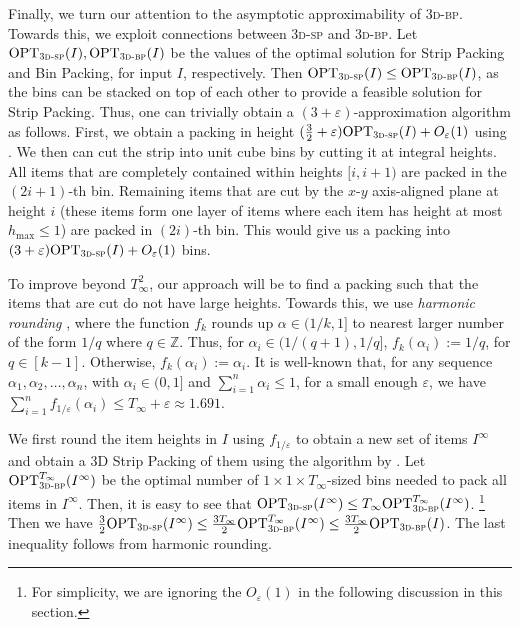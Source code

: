 \documentclass[a4paper,UKenglish,cleveref, autoref, thm-restate]{lipics-v2021}
\newcommand{\eps}{\varepsilon}
\newcommand{\opt}{\mathrm{OPT}}
\newcommand{\tbp}{\textsc{3d-bp}\xspace}
\newcommand{\tsp}{\textsc{3d-sp}\xspace}
\begin{document}
Finally, we turn our attention to the asymptotic approximability of \tbp.
Towards this, we exploit connections between \tsp and \tbp. 
Let $\opt_{\tsp}(I), \opt_{\tbp}(I)$ be the values of the optimal solution for Strip Packing and Bin Packing, for input $I$, respectively. Then $\opt_{\tsp}(I) \le \opt_{\tbp}(I)$, as the bins can be stacked on top of each other to provide a feasible solution for Strip Packing.
Thus, one can trivially obtain a $(3+\eps)$-approximation algorithm as follows. First, we obtain a packing in height $(\frac32+\eps)\opt_{\tsp}(I)+O_{\eps}(1)$ using \cite{3d-strip-packing}. 
We then can cut the strip into unit cube bins by cutting it at integral heights. All items that are completely contained within heights $[i, i+1)$ are packed in the $(2i+1)$-th bin. Remaining items that are cut by the $x$-$y$ axis-aligned plane at height $i$  (these items form one layer of items where each item has height at most $h_{\max} \le 1$) are packed in $(2i)$-th bin. This would give us a packing into $(3+\eps)\opt_{\tsp}(I)+O_{\varepsilon}(1)$ bins. 

To improve beyond $T_{\infty}^2$, our approach will be to find a packing such that the items that are cut do not have large heights. Towards this, we use {\em harmonic rounding}  \cite{LeeL85}, where the function $f_k$ rounds up $\alpha\in(1/k,1]$
to nearest larger number of the form $1/q$ where $q\in \mathbb{Z}$. Thus, for $\alpha_i\in(1/(q+1),1/q]$,  $f_k(\alpha_i):=1/q$, for $q \in [k-1]$.
Otherwise, $f_k(\alpha_i):=\alpha_i$.
It is well-known \cite{bansal2007harmonic} that, for any sequence $\alpha_1, \alpha_2, \dots, \alpha_n$, with $\alpha_i \in (0,1]$ and $\sum_{i=1}^n \alpha_i \le 1$, for a small enough $\eps$,
we have $\sum_{i=1}^n  f_{1/\eps}(\alpha_i) \le T_{\infty}+\eps \approx 1.691$. 

We first round the item heights in $I$ using $f_{1/\eps}$ to obtain a new set of items $I^{\infty}$ and obtain a 3D Strip Packing of them using the algorithm by \cite{jansen2006asymptotic}. Let $\opt_{\tbp}^{T_{\infty}}(I^{\infty})$ be the optimal number of $1\times 1 \times T_{\infty}$-sized bins needed to pack all items in $I^{\infty}$. 
  Then, it is easy to see that  $\opt_{\tsp}(I^{\infty}) \le T_{ \infty}\opt_{\tbp}^{T_{\infty}}(I^{\infty})$. \footnote{For simplicity, we are ignoring the $O_{\varepsilon}(1)$ in the following discussion in this section.} Then we have $\frac32\opt_{\tsp}(I^{\infty}) \le  \frac{3 T_{\infty}}{2}\opt_{\tbp}^{T_{\infty}}(I^{\infty}) \le \frac{3T_{\infty}}{2} \opt_{\tbp}(I)$. The last inequality follows from harmonic rounding. 
  
\end{document}
